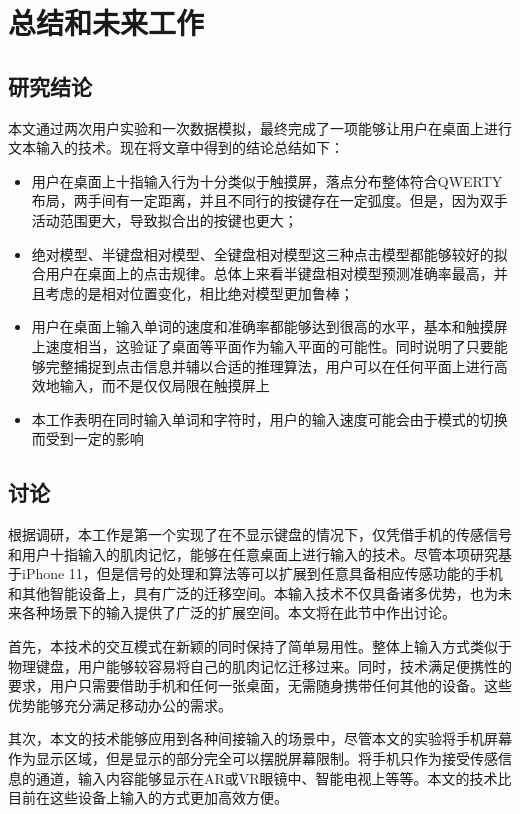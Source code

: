 \chapter{总结和未来工作}
\label{cha:conclusion}
\section{研究结论}
本文通过两次用户实验和一次数据模拟，最终完成了一项能够让用户在桌面上进行文本输入的技术。现在将文章中得到的结论总结如下：
\begin{itemize}
    \item 用户在桌面上十指输入行为十分类似于触摸屏，落点分布整体符合QWERTY布局，两手间有一定距离，并且不同行的按键存在一定弧度。但是，因为双手活动范围更大，导致拟合出的按键也更大；
    \item 绝对模型、半键盘相对模型、全键盘相对模型这三种点击模型都能够较好的拟合用户在桌面上的点击规律。总体上来看半键盘相对模型预测准确率最高，并且考虑的是相对位置变化，相比绝对模型更加鲁棒；
    \item 用户在桌面上输入单词的速度和准确率都能够达到很高的水平，基本和触摸屏上速度相当，这验证了桌面等平面作为输入平面的可能性。同时说明了只要能够完整捕捉到点击信息并辅以合适的推理算法，用户可以在任何平面上进行高效地输入，而不是仅仅局限在触摸屏上
    \item 本工作表明在同时输入单词和字符时，用户的输入速度可能会由于模式的切换而受到一定的影响
\end{itemize}

\section{讨论}
根据调研，本工作是第一个实现了在不显示键盘的情况下，仅凭借手机的传感信号和用户十指输入的肌肉记忆，能够在任意桌面上进行输入的技术。尽管本项研究基于iPhone 11，但是信号的处理和算法等可以扩展到任意具备相应传感功能的手机和其他智能设备上，具有广泛的迁移空间。本输入技术不仅具备诸多优势，也为未来各种场景下的输入提供了广泛的扩展空间。本文将在此节中作出讨论。

首先，本技术的交互模式在新颖的同时保持了简单易用性。整体上输入方式类似于物理键盘，用户能够较容易将自己的肌肉记忆迁移过来。同时，技术满足便携性的要求，用户只需要借助手机和任何一张桌面，无需随身携带任何其他的设备。这些优势能够充分满足移动办公的需求。

其次，本文的技术能够应用到各种间接输入的场景中，尽管本文的实验将手机屏幕作为显示区域，但是显示的部分完全可以摆脱屏幕限制。将手机只作为接受传感信息的通道，输入内容能够显示在AR或VR眼镜中、智能电视上等等。本文的技术比目前在这些设备上输入的方式更加高效方便。

